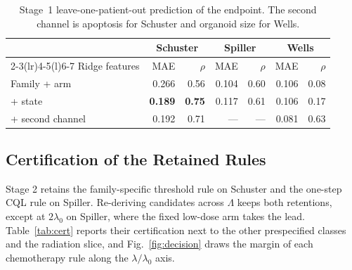 \documentclass[conference]{IEEEtran}
\begin{document}
\begin{table}[t]
\caption{Stage~1 leave-one-patient-out prediction of the endpoint. The second channel is apoptosis for Schuster and organoid size for Wells.}
\label{tab:p1}
\centering
\footnotesize
\setlength{\tabcolsep}{4pt}
\begin{tabular}{@{}lrrrrrr@{}}
\toprule
 & \multicolumn{2}{c}{Schuster} & \multicolumn{2}{c}{Spiller} & \multicolumn{2}{c}{Wells} \\
\cmidrule(lr){2-3}\cmidrule(lr){4-5}\cmidrule(l){6-7}
Ridge features & MAE & \(\rho\) & MAE & \(\rho\) & MAE & \(\rho\) \\
\midrule
Family + arm & 0.266 & 0.56 & 0.104 & 0.60 & 0.106 & 0.08 \\
+ state & \textbf{0.189} & \textbf{0.75} & 0.117 & 0.61 & 0.106 & 0.17 \\
+ second channel & 0.192 & 0.71 & --- & --- & 0.081 & 0.63 \\
\bottomrule
\end{tabular}
\end{table}

\subsection{Certification of the Retained Rules}

Stage 2 retains the family-specific threshold rule on Schuster and the one-step CQL rule on Spiller. Re-deriving candidates across \(\Lambda\) keeps both retentions, except at \(2\lambda_0\) on Spiller, where the fixed low-dose arm takes the lead. Table~\ref{tab:cert} reports their certification next to the other prespecified classes and the radiation slice, and Fig.~\ref{fig:decision} draws the margin of each chemotherapy rule along the \(\lambda/\lambda_0\) axis.
\end{document}
